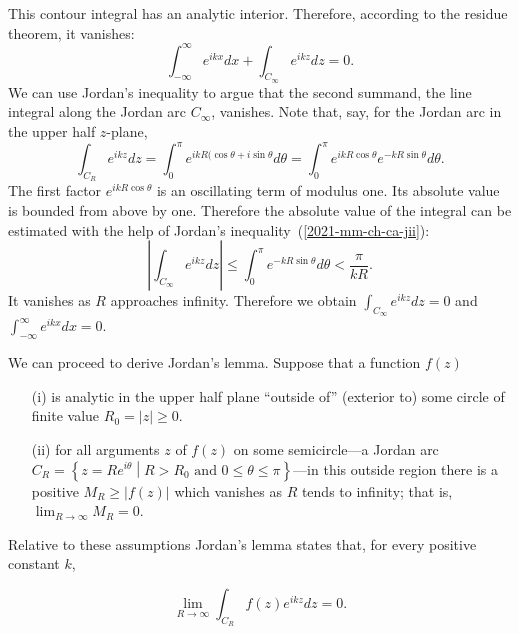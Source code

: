 {This contour integral has an analytic interior.
Therefore, according to the residue theorem,
it vanishes:
\begin{equation}
\int_{-\infty}^\infty e^{i k x} dx + \int_{C_\infty} e^{i k z} dz =0
.
\end{equation}
We can use Jordan's inequality to argue that the second summand,
the line integral along the Jordan arc $C_\infty$, vanishes.
Note that, say, for the Jordan arc in the upper half $z$-plane,
\begin{equation}
\int_{C_R} e^{i k z} dz
=
\int_0^\pi e^{i k R(\cos \theta + i \sin \theta} d\theta
=
\int_0^\pi e^{i k R\cos \theta}  e^{-k R\sin \theta} d\theta.
\end{equation}
The first factor $e^{i k R\cos \theta}$ is an oscillating term of modulus one.
Its absolute value is bounded from above by one.
Therefore the absolute value of the integral can be estimated
with the help of Jordan's inequality~(\ref{2021-mm-ch-ca-jii}):
\begin{equation}
\left|
\int_{C_\infty} e^{i k z} dz
\right|
\le
\int_0^\pi e^{-k R\sin \theta} d\theta
< \frac{\pi}{k R}.
\end{equation}
It vanishes as $R$ approaches infinity.
Therefore we obtain
$\int_{C_\infty} e^{i k z} dz =0$
and $\int_{-\infty}^\infty e^{i k x} dx =0$.

\eexample
}

We can proceed to derive Jordan's lemma.
Suppose that a function $f(z)$
\begin{itemize}
\item[(i)]
is analytic in the upper half plane ``outside of'' (exterior to)
some circle of finite value $R_0=\vert z\vert \ge 0$.

\item[(ii)]
for all arguments $z$ of $f(z)$ on some semicircle---a Jordan arc
$C_R=\left\{ z = Re^{i\theta} \middle| R>R_0 \text{ and } 0\le \theta \le \pi\right\}$---in this outside region
there is a positive $M_R\ge \vert f(z) \vert$ which vanishes as $R$ tends to infinity; that is,
$\lim_{R\rightarrow \infty} M_R=0$.
\end{itemize}
Relative to these assumptions Jordan's lemma states
that, for every positive constant $k$,

\begin{equation}
\label{2021-mm-ch-ca-jle}
\lim_{R\rightarrow \infty}
\int_{C_R} f(z) e^{ikz} dz
=0
.
\end{equation}

